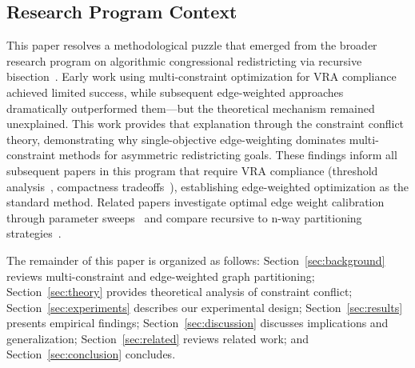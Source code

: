 \subsection{Research Program Context}

This paper resolves a methodological puzzle that emerged from the broader research program on algorithmic congressional redistricting via recursive bisection~\cite{della-libera-recursive-bisection}. Early work using multi-constraint optimization for VRA compliance~\cite{della-libera-vra-compliance-early} achieved limited success, while subsequent edge-weighted approaches~\cite{della-libera-edge-weighted,della-libera-vra-compliance} dramatically outperformed them—but the theoretical mechanism remained unexplained. This work provides that explanation through the constraint conflict theory, demonstrating why single-objective edge-weighting dominates multi-constraint methods for asymmetric redistricting goals. These findings inform all subsequent papers in this program that require VRA compliance (threshold analysis~\cite{della-libera-threshold-analysis}, compactness tradeoffs~\cite{della-libera-compactness-tradeoff}), establishing edge-weighted optimization as the standard method. Related papers investigate optimal edge weight calibration through parameter sweeps~\cite{della-libera-adaptive-bisection} and compare recursive to n-way partitioning strategies~\cite{della-libera-nway-vs-recursive}.

The remainder of this paper is organized as follows: Section~\ref{sec:background} reviews multi-constraint and edge-weighted graph partitioning; Section~\ref{sec:theory} provides theoretical analysis of constraint conflict; Section~\ref{sec:experiments} describes our experimental design; Section~\ref{sec:results} presents empirical findings; Section~\ref{sec:discussion} discusses implications and generalization; Section~\ref{sec:related} reviews related work; and Section~\ref{sec:conclusion} concludes.
